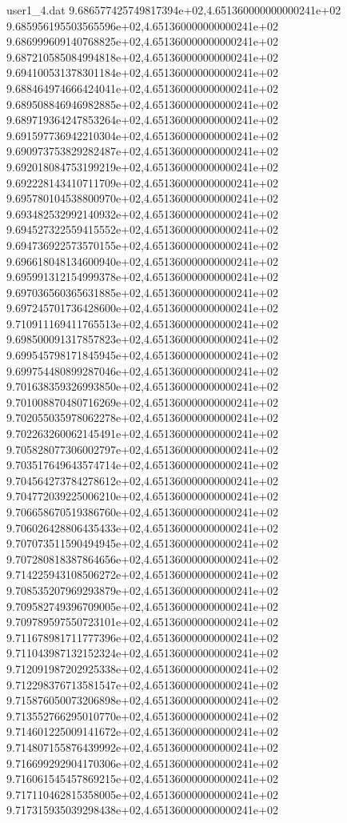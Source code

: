 \begin{filecontents}{user1_4.dat}
9.686577425749817394e+02,4.651360000000000241e+02
9.685956195503565596e+02,4.651360000000000241e+02
9.686999609140768825e+02,4.651360000000000241e+02
9.687210585084994818e+02,4.651360000000000241e+02
9.694100531378301184e+02,4.651360000000000241e+02
9.688464974666424041e+02,4.651360000000000241e+02
9.689508846946982885e+02,4.651360000000000241e+02
9.689719364247853264e+02,4.651360000000000241e+02
9.691597736942210304e+02,4.651360000000000241e+02
9.690973753829282487e+02,4.651360000000000241e+02
9.692018084753199219e+02,4.651360000000000241e+02
9.692228143410711709e+02,4.651360000000000241e+02
9.695780104538800970e+02,4.651360000000000241e+02
9.693482532992140932e+02,4.651360000000000241e+02
9.694527322559415552e+02,4.651360000000000241e+02
9.694736922573570155e+02,4.651360000000000241e+02
9.696618048134600940e+02,4.651360000000000241e+02
9.695991312154999378e+02,4.651360000000000241e+02
9.697036560365631885e+02,4.651360000000000241e+02
9.697245701736428600e+02,4.651360000000000241e+02
9.710911169411765513e+02,4.651360000000000241e+02
9.698500091317857823e+02,4.651360000000000241e+02
9.699545798171845945e+02,4.651360000000000241e+02
9.699754480899287046e+02,4.651360000000000241e+02
9.701638359326993850e+02,4.651360000000000241e+02
9.701008870480716269e+02,4.651360000000000241e+02
9.702055035978062278e+02,4.651360000000000241e+02
9.702263260062145491e+02,4.651360000000000241e+02
9.705828077306002797e+02,4.651360000000000241e+02
9.703517649643574714e+02,4.651360000000000241e+02
9.704564273784278612e+02,4.651360000000000241e+02
9.704772039225006210e+02,4.651360000000000241e+02
9.706658670519386760e+02,4.651360000000000241e+02
9.706026428806435433e+02,4.651360000000000241e+02
9.707073511590494945e+02,4.651360000000000241e+02
9.707280818387864656e+02,4.651360000000000241e+02
9.714225943108506272e+02,4.651360000000000241e+02
9.708535207969293879e+02,4.651360000000000241e+02
9.709582749396709005e+02,4.651360000000000241e+02
9.709789597550723101e+02,4.651360000000000241e+02
9.711678981711777396e+02,4.651360000000000241e+02
9.711043987132152324e+02,4.651360000000000241e+02
9.712091987202925338e+02,4.651360000000000241e+02
9.712298376713581547e+02,4.651360000000000241e+02
9.715876050073206898e+02,4.651360000000000241e+02
9.713552766295010770e+02,4.651360000000000241e+02
9.714601225009141672e+02,4.651360000000000241e+02
9.714807155876439992e+02,4.651360000000000241e+02
9.716699292904170306e+02,4.651360000000000241e+02
9.716061545457869215e+02,4.651360000000000241e+02
9.717110462815358005e+02,4.651360000000000241e+02
9.717315935039298438e+02,4.651360000000000241e+02

\end{filecontents}
